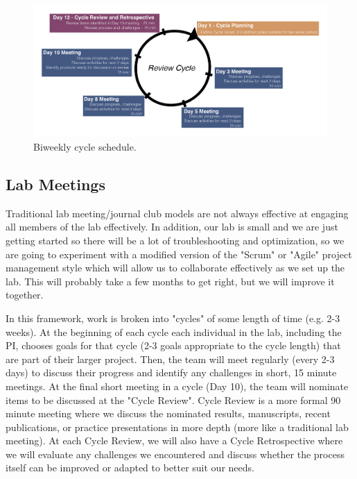 \documentclass[10pt, a4paper, twocolumn]{article} %
\begin{document}
\begin{figure}
  \includegraphics[width=\textwidth]{Core_Competencies-02.png}
  \caption{Biweekly cycle schedule.}
\end{figure}
\subsection{Lab Meetings}
Traditional lab meeting/journal club models are not always effective at engaging all members of the lab effectively.  In addition, our lab is small and we are just getting started so there will be a lot of troubleshooting and optimization, so we are going to experiment with a modified version of the "Scrum" or "Agile" project management style which will allow us to collaborate effectively as we set up the lab. This will probably take a few months to get right, but we will improve it together.

In this framework, work is broken into "cycles" of some length of time (e.g. 2-3 weeks). At the beginning of each cycle each individual in the lab, including the PI, chooses goals for that cycle (2-3 goals appropriate to the cycle length) that are part of their larger project. Then, the team will meet regularly (every 2-3 days) to discuss their progress and identify any challenges in short, 15 minute meetings. At the final short meeting in a cycle (Day 10), the team will nominate items to be discussed at the "Cycle Review". Cycle Review is a more formal 90 minute meeting where we discuss the nominated results, manuscripts, recent publications, or practice presentations in more depth (more like a traditional lab meeting). At each Cycle Review, we will also have a Cycle Retrospective where we will evaluate any challenges we encountered and discuss whether the process itself can be improved or adapted to better suit our needs.
\end{document}
